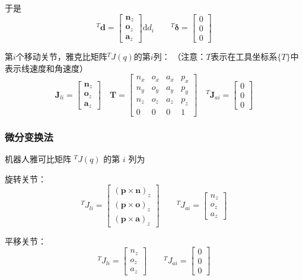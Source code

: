 于是
$$
{}^T \boldsymbol{d} = \begin{bmatrix}
\boldsymbol{n}_z \\
\boldsymbol{o}_z \\
\boldsymbol{a}_z
\end{bmatrix} \mathrm{d}d_i
\qquad
{}^T \boldsymbol{\delta} = \begin{bmatrix}0 \\ 0 \\ 0\end{bmatrix}
$$

第$i$个移动关节，雅克比矩阵${}^TJ(q)$的第$i$列：
\textcolor{whusakura}{（注意：$T$表示在工具坐标系$\{T\}$中表示线速度和角速度）}
$$
\boldsymbol{J}_{li} = \begin{bmatrix}
\boldsymbol{n}_z \\
\boldsymbol{o}_z \\
\boldsymbol{a}_z
\end{bmatrix}
\quad
\boldsymbol{T} = \begin{bmatrix}
n_x & o_x & a_x & p_x \\
n_y & o_y & a_y & p_y \\
n_z & o_z & a_z & p_z \\
0 & 0 & 0 & 1
\end{bmatrix}
\quad
{}^T\boldsymbol{J}_{ai} = \begin{bmatrix}
0 \\
0 \\
0
\end{bmatrix}
$$

\subsubsection{微分变换法}

机器人雅可比矩阵 $^TJ(q)$ 的第 $i$ 列为

旋转关节：
$$
{}^TJ_{li} = \begin{bmatrix} (\boldsymbol{p} \times \boldsymbol{n})_z \\ (\boldsymbol{p} \times \boldsymbol{o})_z \\ (\boldsymbol{p} \times \boldsymbol{a})_z \end{bmatrix}
\qquad
{}^TJ_{ai} = \begin{bmatrix} n_z \\ o_z \\ a_z \end{bmatrix}
$$

平移关节：
$$
{}^TJ_{li} = \begin{bmatrix} n_z \\ o_z \\ a_z \end{bmatrix}
\qquad
{}^TJ_{ai} = \begin{bmatrix} 0 \\ 0 \\ 0 \end{bmatrix}
$$

